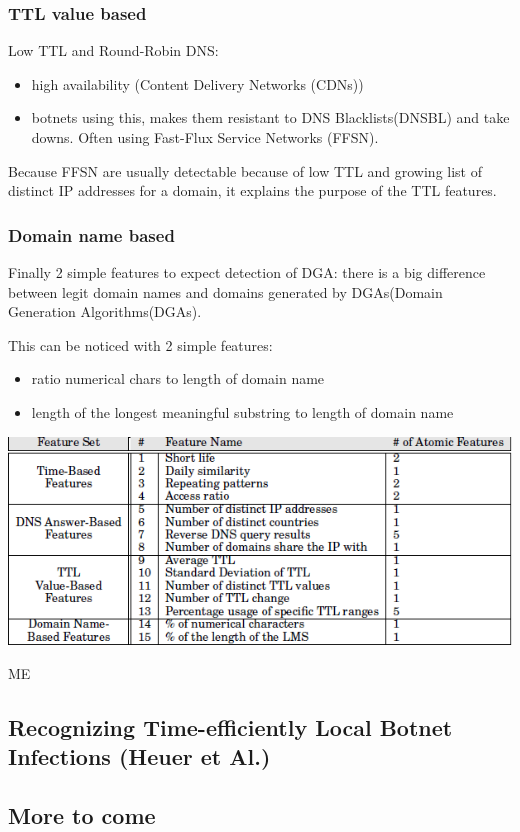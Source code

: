 \subsubsection{TTL value based}
Low TTL and Round-Robin DNS: \\
\begin{itemize}
\item high availability (Content Delivery Networks (CDNs))
\item botnets using this, makes them resistant to DNS Blacklists(DNSBL) and take downs. Often using Fast-Flux Service Networks (FFSN).
\end{itemize}
Because FFSN are usually detectable because of low TTL and growing list of distinct IP addresses for a domain, it explains the purpose of the TTL features.
\subsubsection{Domain name based}
Finally 2 simple features to expect detection of DGA: there is a big difference between legit domain names and domains generated by DGAs(Domain Generation Algorithms(DGAs).

This can be noticed with 2 simple features:\\
\begin{itemize}
\item ratio numerical chars to length of domain name
\item length of the longest meaningful substring to length of domain name
\end{itemize}
\includegraphics[scale=.3]{img/exposure_features.png}

ME


\subsection{Recognizing Time-efficiently Local Botnet Infections (Heuer et Al.)}
\subsection{More to come}	
